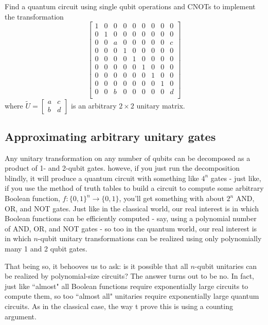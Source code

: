 \begin{example}
    Find a quantum circuit using single qubit operations and CNOTs to implement the transformation
    \[
    \begin{bmatrix}
        1 & 0 & 0 & 0 & 0 & 0 & 0 & 0 & 0 \\ 
        0 & 1 & 0 & 0 & 0 & 0 & 0 & 0 & 0 \\ 
        0 & 0 & a & 0 & 0 & 0 & 0 & 0 & c \\ 
        0 & 0 & 0 & 1 & 0 & 0 & 0 & 0 & 0 \\ 
        0 & 0 & 0 & 0 & 1 & 0 & 0 & 0 & 0 \\ 
        0 & 0 & 0 & 0 & 0 & 1 & 0 & 0 & 0 \\ 
        0 & 0 & 0 & 0 & 0 & 0 & 1 & 0 & 0 \\ 
        0 & 0 & 0 & 0 & 0 & 0 & 0 & 1 & 0 \\
        0 & 0 & b & 0 & 0 & 0 & 0 & 0 & d \\ 
    \end{bmatrix}
    \]
    where $\tilde{U}=\begin{bmatrix}a & c \\ b & d \end{bmatrix}$ is an arbitrary $2\times 2$ unitary matrix.
\end{example}

\subsection{Approximating arbitrary unitary gates}
Any unitary transformation on any number of qubits can be decomposed as a product of 1- and 2-qubit gates. howeve, if you just run the decomposition blindly, it will produce a quantum circuit with something like $4^n$ gates - just like, if you use the method of truth tables to build a circuit to compute some arbitrary Boolean function, $f:\{0,1\}^n \rightarrow \{0,1\}$, you'll get something with about $2^n$ AND, OR, and NOT gates. Just like in the classical world, our real interest is in which Boolean functions can be efficiently computed - say, using a polynomial number of AND, OR, and NOT gates - so too in the quantum world, our real interest is in which $n$-qubit unitary transformations can be realized using only polynomially many 1 and 2 qubit gates.

That being so, it behooves us to ask: is it possible that all $n$-qubit unitaries can be realized by polynomial-size circuits? The answer turns out to be no. In fact, just like ``almost" all Boolean functions require exponentially large circuits to compute them, so too ``almost all" unitaries require exponentially large quantum circuits. As in the classical case, the way t prove this is using a counting argument.

